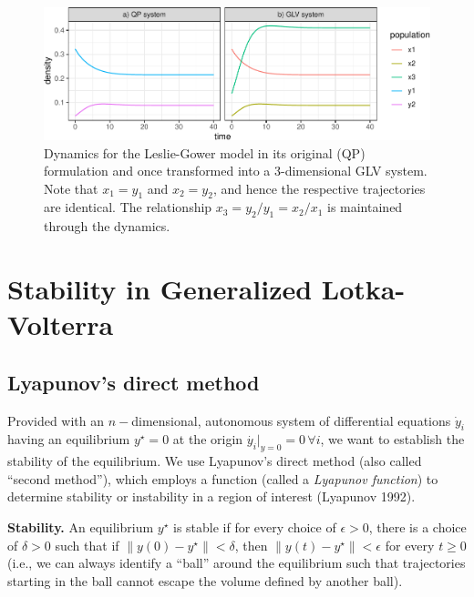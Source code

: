 \documentclass{article}
\begin{document}
\begin{figure}
\centering
\includegraphics{GLV_embedding_files/figure-latex/fig1-1.pdf}
\caption{Dynamics for the Leslie-Gower model in its original (QP)
formulation and once transformed into a 3-dimensional GLV system. Note
that \(x_1 = y_1\) and \(x_2 = y_2\), and hence the respective
trajectories are identical. The relationship
\(x_3 = y_2 / y_1 = x_2 / x_1\) is maintained through the dynamics.}
\end{figure}

\hypertarget{stability-in-generalized-lotka-volterra}{%
\section{Stability in Generalized
Lotka-Volterra}\label{stability-in-generalized-lotka-volterra}}

\hypertarget{lyapunovs-direct-method}{%
\subsection{Lyapunov's direct method}\label{lyapunovs-direct-method}}

Provided with an \(n-\)dimensional, autonomous system of differential
equations \(\dot{y}_i\) having an equilibrium \(y^\star = 0\) at the
origin \(\dot{y_i}|_{y = 0} = 0 \, \forall i\), we want to establish the
stability of the equilibrium. We use Lyapunov's direct method (also
called ``second method''), which employs a function (called a
\emph{Lyapunov function}) to determine stability or instability in a
region of interest (Lyapunov 1992).

\textbf{Stability.} An equilibrium \(y^\star\) is stable if for every
choice of \(\epsilon > 0\), there is a choice of \(\delta > 0\) such
that if \(\lVert y(0) - y^\star \rVert < \delta\), then
\(\lVert y(t) - y^\star \rVert < \epsilon\) for every \(t \geq 0\)
(i.e., we can always identify a ``ball'' around the equilibrium such
that trajectories starting in the ball cannot escape the volume defined
by another ball).
\end{document}
